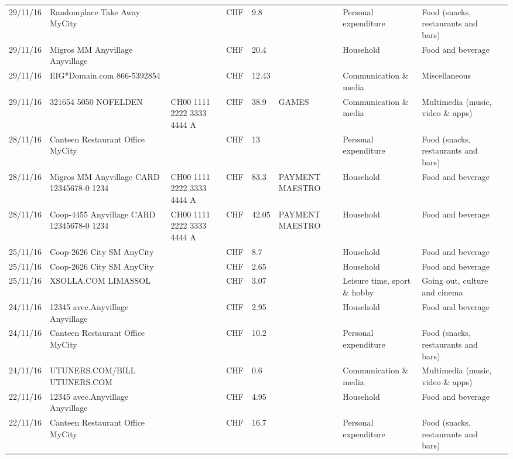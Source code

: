 \begin{landscape}
\begin{tiny}
\begin{longtable}{lp{4cm}llllp{3cm}ll}
		    29/11/16 & Randomplace Take Away     MyCity &       & CHF   & 9.8   &       & Personal expenditure & Food (snacks, restaurants and bars) \\
		    29/11/16 & Migros MM Anyvillage    Anyvillage &       & CHF   & 20.4  &       & Household & Food and beverage \\
		    29/11/16 & EIG*Domain.com           866-5392854 &       & CHF   & 12.43 &       & Communication \& media & Miscellaneous \\
		    29/11/16 & 321654 5050 NOFELDEN & CH00 1111 2222 3333 4444 A & CHF   & 38.9  & GAMES & Communication \& media & Multimedia (music, video \& apps) \\
		    28/11/16 & Canteen Restaurant Office      MyCity &       & CHF   & 13    &       & Personal expenditure & Food (snacks, restaurants and bars) \\
		    28/11/16 & Migros MM Anyvillage CARD 12345678-0 1234 & CH00 1111 2222 3333 4444 A & CHF   & 83.3  & PAYMENT MAESTRO & Household & Food and beverage \\
		    28/11/16 & Coop-4455 Anyvillage CARD 12345678-0 1234 & CH00 1111 2222 3333 4444 A & CHF   & 42.05 & PAYMENT MAESTRO & Household & Food and beverage \\
		    25/11/16 & Coop-2626 City SM        AnyCity &       & CHF   & 8.7   &       & Household & Food and beverage \\
		    25/11/16 & Coop-2626 City SM        AnyCity &       & CHF   & 2.65  &       & Household & Food and beverage \\
		    25/11/16 & XSOLLA.COM               LIMASSOL &       & CHF   & 3.07  &       & Leisure time, sport \& hobby & Going out, culture and cinema \\
		    24/11/16 & 12345 avec.Anyvillage   Anyvillage &       & CHF   & 2.95  &       & Household & Food and beverage \\
		    24/11/16 & Canteen Restaurant Office      MyCity &       & CHF   & 10.2  &       & Personal expenditure & Food (snacks, restaurants and bars) \\
		    24/11/16 & UTUNERS.COM/BILL          UTUNERS.COM &       & CHF   & 0.6   &       & Communication \& media & Multimedia (music, video \& apps) \\
		    22/11/16 & 12345 avec.Anyvillage   Anyvillage &       & CHF   & 4.95  &       & Household & Food and beverage \\
		    22/11/16 & Canteen Restaurant Office      MyCity &       & CHF   & 16.7  &       & Personal expenditure & Food (snacks, restaurants and bars) \\

\end{longtable}
\end{tiny}
\end{landscape}
